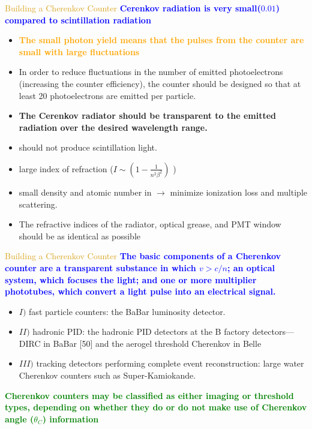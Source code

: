 \documentclass[11pt]{beamer} %
\renewcommand{\(}{\begin{columns}}
\renewcommand{\)}{\end{columns}}
\newcommand{\<}[1]{\begin{column}{#1}}
\renewcommand{\>}{\end{column}}
\newcommand{\itt}{\begin{itemize}}
\newcommand{\tti}{\end{itemize}}
\newcommand{\hlt}[2]{\textcolor{#1}{\textbf{#2}}}
\begin{document}
\begin{frame}{\textcolor{Goldenrod}{Building a Cherenkov Counter}}
  \hlt{Blue}{Cerenkov radiation is very small($0.01$) compared to 
    scintillation radiation}
  \itt
\item \hlt{Orange}{ The small photon yield means that the pulses from
    the counter are small with large fluctuations}
\item In order to reduce fluctuations in the number of emitted
  photoelectrons (increasing the counter efficiency), the counter should
  be designed so that at least 20 photoelectrons are emitted per
  particle.
\item \hlt{JungleGreen}{The Cerenkov radiator should be transparent to the emitted
  radiation over the desired wavelength range.}
\scriptsize
\item should not produce scintillation light.
\item large index of refraction ($ I \sim
  (1 - \frac{1}{n^2\beta^2})$ )
\item small density and atomic number in $\to$ minimize ionization loss and multiple scattering.
\item The refractive indices of the radiator, optical grease, and PMT
  window should be as identical as possible
  \tti
\end{frame}  

\begin{frame}{\textcolor{Goldenrod}{Building a Cherenkov Counter}}
  \hlt{Blue}{The basic components of a Cherenkov counter are a transparent
  substance in which $v > c/n$; an optical system, which focuses the
  light; and one or more multiplier phototubes, which convert a light
  pulse into an electrical signal.} 
\itt
\item [$I)$] fast particle counters: the BaBar luminosity detector.
\item [$II)$] hadronic PID: the hadronic PID detectors at the B factory detectors—DIRC in
  BaBar [50] and the aerogel threshold Cherenkov in Belle
\item [$III)$] tracking detectors 
  performing complete event reconstruction: large water Cherenkov
  counters such as Super-Kamiokande.
  \tti
  \hlt{Green}{ Cherenkov counters may be classified as either imaging or threshold
    types, depending on whether they do or do not make use of Cherenkov
    angle ($\theta_C$) information}
\end{frame}
\end{document}

